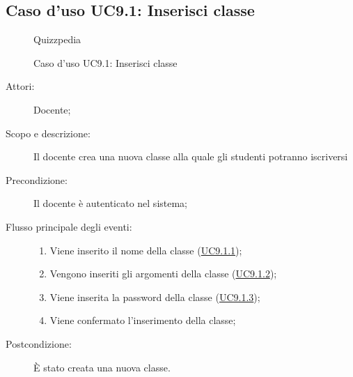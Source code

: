 \subsection{Caso d'uso UC9.1: Inserisci classe}
        \begin{figure}[H]
            \centering
            \begin{resizedtikzpicture}{\textwidth}
		\begin{umlsystem}[x=0, fill=lightgray!20]{Quizzpedia}
		\end{umlsystem}
            \end{resizedtikzpicture}
            \caption{Caso d'uso UC9.1: Inserisci classe}
            \label{fig:UC9.1} 
        \end{figure}
    \begin{description}
\item[Attori:] Docente;
\item[Scopo e descrizione:] Il docente crea una nuova classe alla quale gli studenti potranno iscriversi 
      \item[Precondizione:] Il docente è autenticato nel sistema;

        \item[Flusso principale degli eventi:] \begin{enumerate}
          \item Viene inserito il nome della classe (\hyperlink{UC9.1.1}{UC9.1.1});
          \item Vengono inseriti gli argomenti della classe (\hyperlink{UC9.1.2}{UC9.1.2});
          \item Viene inserita la password della classe (\hyperlink{UC9.1.3}{UC9.1.3});
          \item Viene confermato l'inserimento della classe;

      \end{enumerate}
    \item[Postcondizione:] È stato creata una nuova classe.
  \end{description}
\hypertarget{UC9.1.1}{}
